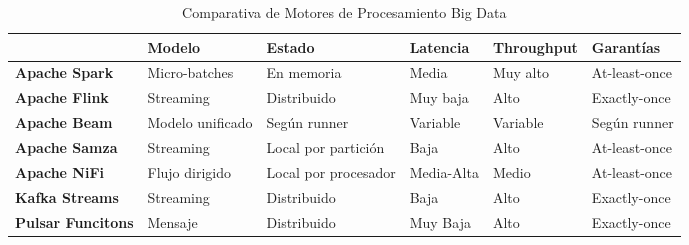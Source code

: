 \begin{table}[htbp]
    \footnotesize
    \renewcommand{\arraystretch}{1.2}
    \centering
    \caption{Comparativa de Motores de Procesamiento Big Data}
    \label{tab:comparison-engines}
    \setlength{\tabcolsep}{3pt}
    \begin{tabularx}{\textwidth}{|>{\raggedright\arraybackslash}m{2.2cm}|>{\raggedright\arraybackslash}m{}|>{\raggedright\arraybackslash}m{}|>{\raggedright\arraybackslash}m{}|>{\raggedright\arraybackslash}m{}|>{\raggedright\arraybackslash}m{}|}
    \hline
    \rule{0pt}{5ex} & \textbf{Modelo} & \textbf{Estado} & \textbf{Latencia} & \textbf{Throughput} & \textbf{Garantías} \\[0.3ex]
    \hline
    \textbf{Apache Spark} & Micro-batches & En memoria & Media & Muy alto & At-least-once \\[0.3ex]
    \hline
    \textbf{Apache Flink} & Streaming & Distribuido & Muy baja & Alto & Exactly-once \\[0.3ex]
    \hline
    \textbf{Apache Beam} & Modelo unificado & Según runner & Variable & Variable & Según runner \\[0.3ex]
    \hline
    \textbf{Apache Samza} & Streaming & Local por partición & Baja & Alto & At-least-once \\[0.3ex]
    \hline
    \textbf{Apache NiFi} & Flujo dirigido & Local por procesador & Media-Alta & Medio & At-least-once \\[0.3ex]
    \hline
    \textbf{Kafka Streams} & Streaming & Distribuido & Baja & Alto & Exactly-once \\[0.3ex]
    \hline
    \textbf{Pulsar Funcitons} & Mensaje & Distribuido & Muy Baja & Alto & Exactly-once \\[0.3ex]
    \hline
    \end{tabularx}
    \end{table}
\clearpage
\newpage